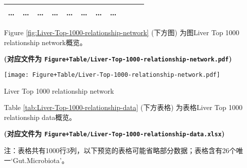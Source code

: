 \documentclass[
]{article}
\begin{document}
\begin{longtable}[]{@{}lllllllllll@{}}
\begin{minipage}[t]{0.09\columnwidth}
\ldots{}\strut
\end{minipage} & \begin{minipage}[t]{0.07\columnwidth}\raggedright
\ldots{}\strut
\end{minipage} & \begin{minipage}[t]{0.07\columnwidth}\raggedright
\ldots{}\strut
\end{minipage} & \begin{minipage}[t]{0.09\columnwidth}\raggedright
\ldots{}\strut
\end{minipage} & \begin{minipage}[t]{0.07\columnwidth}\raggedright
\ldots{}\strut
\end{minipage} & \begin{minipage}[t]{0.07\columnwidth}\raggedright
\ldots{}\strut
\end{minipage} & \begin{minipage}[t]{0.07\columnwidth}\raggedright
\ldots{}\strut
\end{minipage} & \begin{minipage}[t]{0.03\columnwidth}\raggedright
\ldots{}\strut
\end{minipage}\tabularnewline
\bottomrule
\end{longtable}

Figure \ref{fig:Liver-Top-1000-relationship-network} (下方图) 为图Liver Top 1000 relationship network概览。

\textbf{(对应文件为 \texttt{Figure+Table/Liver-Top-1000-relationship-network.pdf})}

\def\@captype{figure}
\begin{center}
\texttt{[image: Figure+Table/Liver-Top-1000-relationship-network.pdf]}
\caption{Liver Top 1000 relationship network}\label{fig:Liver-Top-1000-relationship-network}
\end{center}

Table \ref{tab:Liver-Top-1000-relationship-data} (下方表格) 为表格Liver Top 1000 relationship data概览。

\textbf{(对应文件为 \texttt{Figure+Table/Liver-Top-1000-relationship-data.xlsx})}

\begin{center}\begin{tcolorbox}[colback=gray!10, colframe=gray!50, width=0.9\linewidth, arc=1mm, boxrule=0.5pt]注：表格共有1000行3列，以下预览的表格可能省略部分数据；表格含有26个唯一`Gut.Microbiota'。
\end{tcolorbox}
\end{center}
\end{document}
